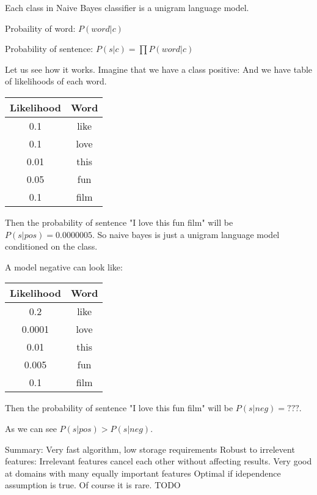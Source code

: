 \documentclass[12pt]{report}
\begin{document}
Each class in Naive Bayes classifier is a unigram language model.

Probaility of word: $P(word | c)$

Probability of sentence: $P(s | c) = \prod{}{P(word | c)}$

Let us see how it works. Imagine that we have a class positive:
And we have table of likelihoods of each word.


\begin{center}
  \begin{tabular}{ c | c }
    \hline
    Likelihood & Word \\ \hline
    0.1 & like\\ \hline
    0.1 & love \\ \hline
    0.01 & this \\ \hline
    0.05 & fun \\ \hline
    0.1 & film \\ \hline
  \end{tabular}
\end{center}

Then the probability of sentence "I love this fun film" will be $P(s | pos) = 0.0000005$.
So naive bayes is just a unigram language model conditioned on the class.

A model negative can look like:

\begin{center}
  \begin{tabular}{ c | c }
    \hline
    Likelihood & Word \\ \hline
    0.2 & like\\ \hline
    0.0001 & love \\ \hline
    0.01 & this \\ \hline
    0.005 & fun \\ \hline
    0.1 & film \\ \hline
  \end{tabular}
\end{center}

Then the probability of sentence "I love this fun film" will be $P(s | neg) = ???$.

As we can see $P(s | pos) > P(s | neg)$.


Summary:
Very fast algorithm, low storage requirements
Robust to irrelevent features: Irrelevant features cancel each other without affecting results.
Very good at domains with many equally important features
Optimal if idependence assumption is true. Of course it is rare.
TODO
\end{document}
